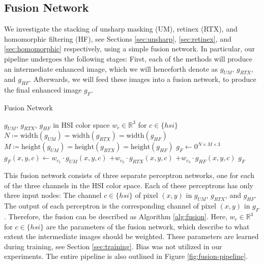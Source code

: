 \documentclass[sigconf]{acmart}
\begin{document}
\subsection{Fusion Network}\label{sec:fusion}
We investigate the stacking of unsharp masking (UM), retinex (RTX), and homomorphic filtering (HF), see Sections \ref{sec:unsharp}, \ref{sec:retinex}, and \ref{sec:homomorphic} respectively, using a simple fusion network. In particular, our pipeline undergoes the following stages: First, each of the methods will produce an intermediate enhanced image, which we will henceforth denote as $g_{UM}$, $g_{RTX}$, and $g_{HF}$. Afterwards, we will feed these images into a fusion network, to produce the final enhanced image $g_{F}$.

\begin{algorithm}
	\caption{Fusion Network}\label{alg:fusion}
	\begin{algorithmic}
	\Require $g_{UM}$, $g_{RTX}$, $g_{HF}$ in HSI color space
	\Require $w_{c} \in \mathbb{R}^3$ for $c \in \{hsi\}$
	\Ensure $N \coloneqq \text{width}(g_{UM}) = \text{width}(g_{RTX}) = \text{width}(g_{HF})$
	\Ensure $M \coloneqq \text{height}(g_{UM}) = \text{height}(g_{RTX}) = \text{height}(g_{HF})$
	\State $g_{F} \gets 0^{N \times M \times 3}$
			\State $g_{F}(x,y,c) \gets w_{c_1} \cdot g_{UM}(x,y,c)$
			\State \qquad \qquad \qquad  $+ w_{c_2} \cdot g_{RTX}(x,y,c)$
			\State \qquad \qquad \qquad $+ w_{c_3} \cdot g_{HF}(x,y,c)$
		\EndFor
	\EndFor
	\State \Return $g_{F}$
	\end{algorithmic}
	\end{algorithm}

This fusion network consists of three separate perceptron networks, one for each of the three channels in the HSI color space. Each of these perceptrons has only three input nodes: The channel $c \in \{hsi\}$ of pixel $(x,y)$ in $g_{UM}$, $g_{RTX}$, and $g_{HF}$. The output of each perceptron is the corresponding channel of pixel $(x,y)$ in $g_{F}$. Therefore, the fusion can be described as Algorithm \ref{alg:fusion}. Here, $w_{c} \in \mathbb{R}^3$ for $c \in \{hsi\}$ are the parameters of the fusion network, which describe to what extent the intermediate images should be weighted. These parameters are learned during training, see Section \ref{sec:training}. Bias was not utilized in our experiments. The entire pipeline is also outlined in Figure \ref{fig:fusion-pipeline}.
\end{document}
